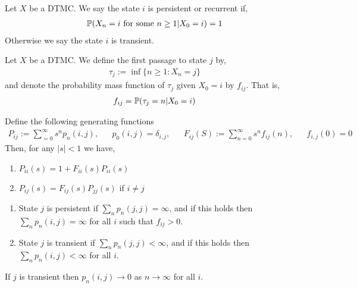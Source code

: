 \documentclass[12pt]{article}
\begin{document}
\begin{definition}
Let \( X \) be a DTMC. We say the state \( i \) is persistent or recurrent if,
\begin{align*}
    \mathbb{P}(X_n = i\text{ for some } n \geq 1 | X_0 = i) = 1
\end{align*}
Otherwise we say the state \( i \) is transient.
\end{definition}

\begin{definition}
Let \( X \) be a DTMC. We define the first passage to state \( j \) by,
\begin{align*}
    \tau_j := \inf\{n\geq 1 : X_n = j \}
\end{align*}
and denote the probability mass function of \( \tau_j \) given \( X_0 = i \) by \( f_{ij} \). That is,
\begin{align*}
    f_{ij} = \mathbb{P}(\tau_j = n | X_0 = i)
\end{align*}
\end{definition}

\begin{theorem}
Define the following generating functions
\begin{align*}
    P_{ij}:= \sum_{=0}^{\infty} s^np_n(i,j),
    && p_0(i,j) = \delta_{i,j},
    && F_{ij}(S) := \sum_{n=0}^{\infty} s^n f_{ij}(n),
    && f_{i,j}(0) = 0
\end{align*}
Then, for any \( |s|<1 \) we have,
\begin{enumerate}[nolistsep]
    \item \( P_{ii}(s) = 1 + F_{ii}(s)P_{ii}(s) \)
    \item \( P_{ij}(s) = F_{ij}(s)P_{jj}(s) \) if \( i\neq j \)
\end{enumerate}
\end{theorem}

\begin{theorem}
\begin{enumerate}
    \item State \( j \) is persistent if \( \sum_n p_n(j,j) = \infty \), and if this holds then \( \sum_n p_n(i,j) = \infty \) for all \( i \) such that \( f_{ij} > 0 \).
    \item State \( j \) is transient if \( \sum_n p_n(j,j) < \infty \), and if this holds then \( \sum_n p_n(i,j) < \infty \) for all \( i \).
\end{enumerate}
\end{theorem}


\begin{theorem}
If \( j \) is transient then \( p_n(i,j) \to 0 \) as \( n\to\infty \) for all \( i \).
\end{theorem}
\end{document}
